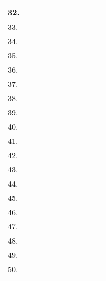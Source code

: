 \documentclass{article}
\begin{document}
\begin{small}
\begin{tabular}{|m{2cm}|m{2cm}|m{6mm}|m{2cm}|m{3cm}|m{6mm}|m{6mm}|m{6mm}|m{6mm}|m{6mm}|m{6mm}|}
\hline
32.& & & & & & & & & & \\
\hline
33.& & & & & & & & & & \\
\hline
34.& & & & & & & & & & \\
\hline
35.& & & & & & & & & & \\
\hline
36.& & & & & & & & & & \\
\hline
37.& & & & & & & & & & \\
\hline
38.& & & & & & & & & & \\
\hline
39.& & & & & & & & & & \\
\hline
40.& & & & & & & & & & \\
\hline
41.& & & & & & & & & & \\
\hline
42.& & & & & & & & & & \\
\hline
43.& & & & & & & & & & \\
\hline
44.& & & & & & & & & & \\
\hline
45.& & & & & & & & & & \\
\hline
46.& & & & & & & & & & \\
\hline
47.& & & & & & & & & & \\
\hline
48.& & & & & & & & & & \\
\hline
49.& & & & & & & & & & \\
\hline
50.& & & & & & & & & & \\
\hline
\end{tabular}
\end{small}

\newpage
\end{document}
